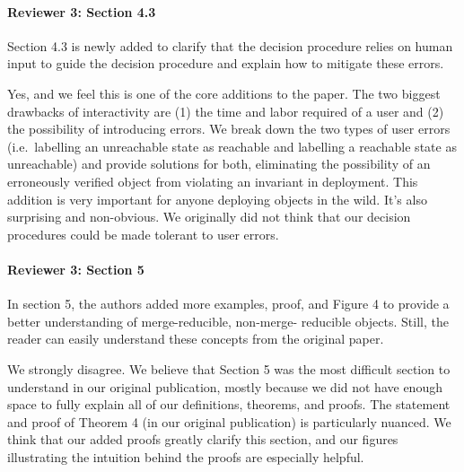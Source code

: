 \documentclass[9pt]{article}
\begin{document}
\begin{multicols*}{2}
\paragraph{Reviewer 3: Section 4.3}
\begin{feedback}
  Section 4.3 is newly added to clarify that the decision procedure relies on
  human input to guide the decision procedure and explain how to mitigate these
  errors.
\end{feedback}
Yes, and we feel this is one of the core additions to the paper. The two
biggest drawbacks of interactivity are (1) the time and labor required of a
user and (2) the possibility of introducing errors. We break down the two types
of user errors (i.e.\ labelling an unreachable state as reachable and labelling
a reachable state as unreachable) and provide solutions for both, eliminating
the possibility of an erroneously verified \invariantconfluent{} object from
violating an invariant in deployment. This addition is very important for
anyone deploying \invariantconfluent{} objects in the wild. It's also
surprising and non-obvious. We originally did not think that our decision
procedures could be made tolerant to user errors.

\paragraph{Reviewer 3: Section 5}
\begin{feedback}
  In section 5, the authors added more examples, proof, and Figure 4 to provide
  a better understanding of merge-reducible, non-merge- reducible objects.
  Still, the reader can easily understand these concepts from the original
  paper.
\end{feedback}
We strongly disagree. We believe that Section 5 was the most difficult section
to understand in our original publication, mostly because we did not have
enough space to fully explain all of our definitions, theorems, and proofs. The
statement and proof of Theorem 4 (in our original publication) is particularly
nuanced. We think that our added proofs greatly clarify this section, and our
figures illustrating the intuition behind the proofs are especially helpful.


\end{multicols*}
\end{document}
